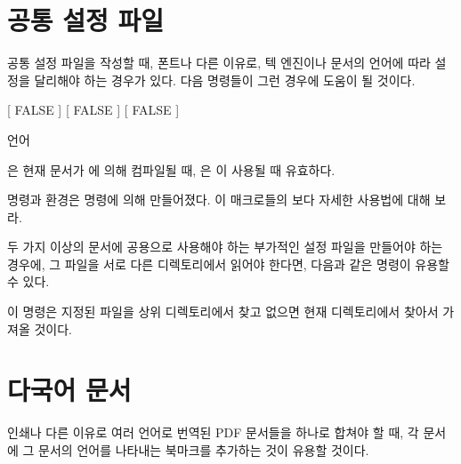 \documentclass[pairquote, minted]{hzguide}
\begin{document}
\section{공통 설정 파일}

공통 설정 파일을 작성할 때, 폰트나 다른 이유로, 텍 엔진이나 문서의 언어에 따라 설정을 달리해야 하는 경우가 있다. 
다음 명령들이 그런 경우에 도움이 될 것이다.

\begin{code}
[ FALSE ]
[ FALSE ]
[ FALSE ]
\begin{IfLanguage}{언어} \end{IfLanguage}
\end{code}

\macro{\IfXetex}은 현재 문서가 에 의해 컴파일될 때, \macro{\IfLuatex}은 이 사용될 때 유효하다.


\macro{\ifLang} 명령과  환경은 \macro{\NewConditionals} 명령에 의해 만들어졌다.
이 매크로들의 보다 자세한 사용법에 대해 \를 보라.

두 가지 이상의 문서에 공용으로 사용해야 하는 부가적인 설정 파일을 만들어야 하는 경우에, 그 파일을 서로 다른 디렉토리에서 읽어야 한다면, 다음과 같은 명령이 유용할 수 있다.

\begin{code}
\NewDocumentCommand {}
{
    { 
         
    }{
    }
}
\end{code}

이 명령은 지정된 파일을 상위 디렉토리에서 찾고 없으면 현재 디렉토리에서 찾아서 가져올 것이다.

\section{다국어 문서}

인쇄나 다른 이유로 여러 언어로 번역된 PDF 문서들을 하나로 합쳐야 할 때, 각 문서에 그 문서의 언어를 나타내는 북마크를 추가하는 것이 유용할 것이다.
\end{document}
